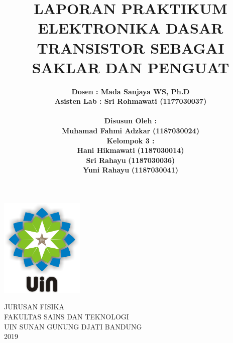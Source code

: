 \documentclass[12pt,a4paper]{article}
\begin{document}
\onehalfspacing
\begin{titlepage}

\title{\textbf{LAPORAN PRAKTIKUM ELEKTRONIKA DASAR
\\ TRANSISTOR SEBAGAI SAKLAR DAN PENGUAT}}  %
\author{\textbf {Dosen : Mada Sanjaya WS, Ph.D  }
\\ \textbf{Asisten Lab : Sri Rohmawati (1177030037)}
\\ \textbf{ }
\\ \textbf{Disusun Oleh :}
\\ \textbf{Muhamad Fahmi Adzkar} \textbf {(1187030024)}
\\ \textbf{Kelompok 3 :}
\\ \textbf{Hani Hikmawati} \textbf {(1187030014)}
\\ \textbf{Sri Rahayu} \textbf {(1187030036)}
\\ \textbf{Yuni Rahayu} \textbf {(1187030041)}}

\maketitle
\begin{center}
\vspace{1cm}
\includegraphics[width=4cm]{uin.png}
\vspace{1cm}

JURUSAN FISIKA\\
FAKULTAS SAINS DAN TEKNOLOGI\\
UIN SUNAN GUNUNG DJATI BANDUNG\\
2019\\
\end{center}
\end{titlepage}
\end{document}
